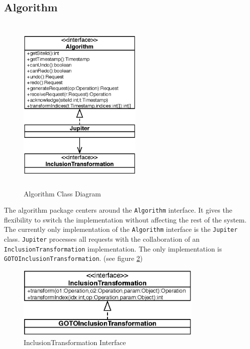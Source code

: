 \subsection{Algorithm}

\begin{figure}[H]
\centering
\includegraphics[width=6cm,height=8.78cm]{../images/finalreport/algorithm.eps}
\caption{Algorithm Class Diagram}
\label{fig:algorithm.uml}
\end{figure}

The algorithm package centers around the \texttt{Algorithm} interface.
It gives the flexibility to switch the implementation without affecting the 
rest of the system. The currently only implementation of the \texttt{Algorithm} 
interface is the \texttt{Jupiter} class. \texttt{Jupiter} processes 
all requests with the collaboration of an \texttt{InclusionTransformation}
implementation. The only implementation is \texttt{GOTOInclusionTransformation}. (see figure \ref{fig:algorithm.transformation.uml})

\begin{figure}
\centering
\includegraphics[width=9cm,height=3.49cm]{../images/finalreport/algorithm_transformation.eps}
\caption{InclusionTransformation Interface}
\label{fig:algorithm.transformation.uml}
\end{figure}

